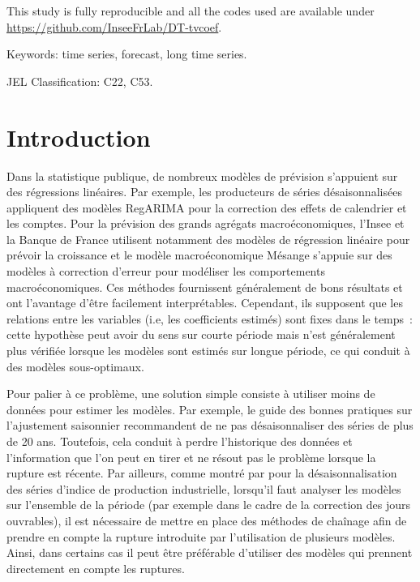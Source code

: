 \documentclass[
  a4paper,
  DIV=11,
  numbers=noendperiod,
  french]{scrartcl}
\newcommand\1{{\mathds 1}}
\theoremstyle{remark}
\begin{document}
This study is fully reproducible and all the codes used are available
under \url{https://github.com/InseeFrLab/DT-tvcoef}.

Keywords: time series, forecast, long time series.

JEL Classification: C22, C53.

\newpage

\section{Introduction}\label{introduction}

Dans la statistique publique, de nombreux modèles de prévision
s'appuient sur des régressions linéaires. Par exemple, les producteurs
de séries désaisonnalisées appliquent des modèles RegARIMA pour la
correction des effets de calendrier et les comptes. Pour la prévision
des grands agrégats macroéconomiques, l'Insee
\autocite[e.g.,][]{ndc2015prev} et la Banque de France
\autocite[e.g.,][]{OPTIM} utilisent notamment des modèles de régression
linéaire pour prévoir la croissance et le modèle macroéconomique Mésange
\autocite{mesange} s'appuie sur des modèles à correction d'erreur pour
modéliser les comportements macroéconomiques. Ces méthodes fournissent
généralement de bons résultats et ont l'avantage d'être facilement
interprétables. Cependant, ils supposent que les relations entre les
variables (i.e, les coefficients estimés) sont fixes dans le temps~:
cette hypothèse peut avoir du sens sur courte période mais n'est
généralement plus vérifiée lorsque les modèles sont estimés sur longue
période, ce qui conduit à des modèles sous-optimaux.

Pour palier à ce problème, une solution simple consiste à utiliser moins
de données pour estimer les modèles. Par exemple, le guide des bonnes
pratiques sur l'ajustement saisonnier \autocite{eurostat2015guidelines}
recommandent de ne pas désaisonnaliser des séries de plus de 20 ans.
Toutefois, cela conduit à perdre l'historique des données et
l'information que l'on peut en tirer et ne résout pas le problème
lorsque la rupture est récente. Par ailleurs, comme montré par
\textcite{JMS2018} pour la désaisonnalisation des séries d'indice de
production industrielle, lorsqu'il faut analyser les modèles sur
l'ensemble de la période (par exemple dans le cadre de la correction des
jours ouvrables), il est nécessaire de mettre en place des méthodes de
chaînage afin de prendre en compte la rupture introduite par
l'utilisation de plusieurs modèles. Ainsi, dans certains cas il peut
être préférable d'utiliser des modèles qui prennent directement en
compte les ruptures.
\end{document}
